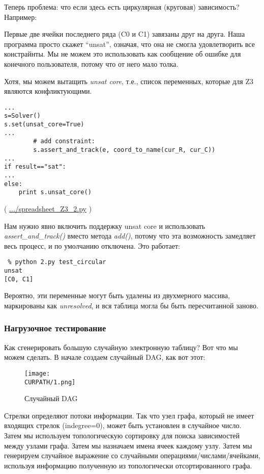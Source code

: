 Теперь проблема: что если здесь есть циркулярная (круговая) зависимость? Например:



Первые две ячейки последнего ряда (C0 и C1) завязаны друг на друга.
Наша программа просто скажет ``unsat'', означая, что она не смогла удовлетворить все констрайнты.
Мы не можем это использовать как сообщение об ошибке для конечного пользователя, потому что от него мало толка.

Хотя, мы можем вытащить \textit{unsat core}, т.е., список переменных, которые для Z3 являются конфликтующими.

\begin{lstlisting}
...
s=Solver()
s.set(unsat_core=True)
...
        # add constraint:
        s.assert_and_track(e, coord_to_name(cur_R, cur_C))
...
if result=="sat":
...
else:
    print s.unsat_core()
\end{lstlisting}

( \url{.../spreadsheet_Z3_2.py} )

Нам нужно явно включить поддержку unsat core и использовать \textit{assert\_and\_track()} вместо метода \textit{add()},
потому что эта возможность замедляет весь процесс, и по умолчанию отключена.
Это работает:

\begin{lstlisting}
 % python 2.py test_circular
unsat
[C0, C1]
\end{lstlisting}

Вероятно, эти переменные могут быть удалены из двухмерного массива, маркированы как \textit{unresolved},
и вся таблица могла бы быть пересчитанной заново.

\subsubsection{Нагрузочное тестирование}

Как сгенерировать большую случайную электронную таблицу?
Вот что мы можем сделать.
В начале создаем случайный \ac{DAG}, как вот этот:

\begin{figure}[H]
\centering
\texttt{[image: \\CURPATH/1.png]}
\caption{Случайный DAG}
\end{figure}

Стрелки определяют потоки информации.
Так что узел графа, который не имеет входящих стрелок (indegree=0), может быть установлен в случайное число.
Затем мы используем топологическую сортировку для поиска зависимостей между узлами графа.
Затем мы назначаем имена ячеек каждому узлу.
Затем мы генерируем случайное выражение со случайными операциями/числами/ячейками, используя информацию
полученную из топологически отсортированного графа.

